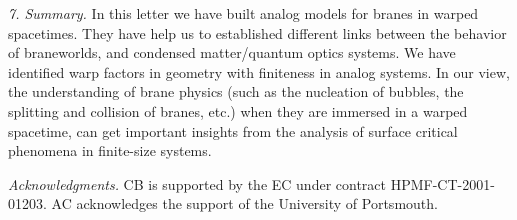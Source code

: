 \documentclass[a4paper,prl,showpacs,twocolumn]{revtex4}
\begin{document}
\noindent
{\it 7. Summary.}
In this letter we have built analog models for branes in warped spacetimes.  
They have help us to established different links
between the behavior of braneworlds, and condensed matter/quantum optics
systems. 
We have identified warp factors in geometry with finiteness in analog 
systems. 
In our view, the understanding of brane physics (such as the
nucleation of bubbles, the splitting and collision of branes, etc.) when
they are immersed in a warped spacetime, can get important insights
from the analysis of surface critical phenomena in finite-size systems.  




\noindent
{\it Acknowledgments.}
CB is supported by the EC under contract HPMF-CT-2001-01203.
AC acknowledges the support of the University of Portsmouth.
\end{document}
